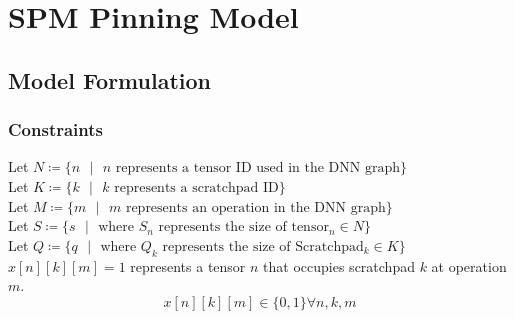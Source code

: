 
\chapter{SPM Pinning Model} %

\label{Chapter4} %

\section{Model Formulation}

\subsection{Constraints}
Let $N \coloneqq \{ n \text{ }  | \text{ } n   \text{ represents a tensor ID used in the DNN graph}\}$\\
Let $K \coloneqq \{ k \text{ }  | \text{ } k   \text{ represents a scratchpad ID}\}$\\
Let $M \coloneqq \{ m \text{ }  | \text{ } m   \text{ represents an operation in the DNN graph}\}$\\
Let $S \coloneqq \{ s \text{ }| \text{ } \text{where } S_n \text{ represents the size of tensor$_n \in N$}\}$\\
Let $Q \coloneqq \{ q \text{ }| \text{ } \text{where } Q_k \text{ represents the size of Scratchpad$_k \in K$}\}$\\

$x[n][k][m] = 1$ represents a tensor $n$ that occupies scratchpad $k$ at operation $m$.\\

\[
x[n][k][m] \in \{0, 1\} \forall n,k,m
\]


